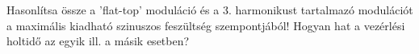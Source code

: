 \begin{example}

Hasonlítsa össze a ’flat-top’ moduláció és a 3. harmonikust tartalmazó modulációt a maximális kiadható szinuszos feszültség szempontjából! Hogyan hat a vezérlési holtidő az egyik ill. a másik esetben?

\tcbline
\vspace{1mm}

\solution

\end{example}